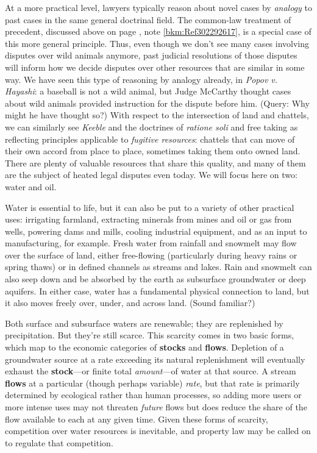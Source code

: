 At a more practical level, lawyers typically reason about novel cases by
\textit{analogy} to past cases in the same general doctrinal field. The
common-law treatment of precedent, discussed above on page
\pageref{bkm:Ref302292617}, note \ref{bkm:Ref302292617}, is a special case of
this more general principle. Thus, even though we don't see many cases involving
disputes over wild animals anymore, past judicial resolutions of those disputes
will inform how we decide disputes over other resources that are similar in some
way. We have seen this type of reasoning by analogy already, in \textit{Popov v.
Hayashi}: a baseball is not a wild animal, but Judge McCarthy thought cases
about wild animals provided instruction for the dispute before him. (Query: Why
might he have thought so?) With respect to the intersection of land and
chattels, we can similarly see \textit{Keeble} and the doctrines of
\textit{ratione soli} and free taking as reflecting principles applicable to
\textit{fugitive resources}: chattels that can move of their own accord from
place to place, sometimes taking them onto owned land. There are plenty of
valuable resources that share this quality, and many of them are the subject of
heated legal disputes even today. We will focus here on two: water and oil.

Water is essential to life, but it can also be put to a variety of other
practical uses: irrigating farmland, extracting minerals from mines and oil or
gas from wells, powering dams and mills, cooling industrial equipment, and as an
input to manufacturing, for example. Fresh water from rainfall and snowmelt may
flow over the surface of land, either free-flowing (particularly during heavy
rains or spring thaws) or in defined channels as streams and lakes. Rain and
snowmelt can also seep down and be absorbed by the earth as subsurface
groundwater or deep aquifers. In either case, water has a fundamental physical
connection to land, but it also moves freely over, under, and across land.
(Sound familiar?)

Both surface and subsurface waters are renewable; they are replenished by
precipitation. But they're still scarce. This scarcity comes in two basic forms,
which map to the economic categories of \textbf{stocks} and \textbf{flows}.
Depletion of a groundwater source at a rate exceeding its natural replenishment
will eventually exhaust the \textbf{stock}---or finite total
\textit{amount}---of water at that source. A stream \textbf{flows} at a
particular (though perhaps variable) \textit{rate}, but that rate is primarily
determined by ecological rather than human processes, so adding more users or
more intense uses may not threaten \textit{future} flows but does reduce the
share of the flow available to each at any given time. Given these forms of
scarcity, competition over water resources is inevitable, and property law may
be called on to regulate that competition.

